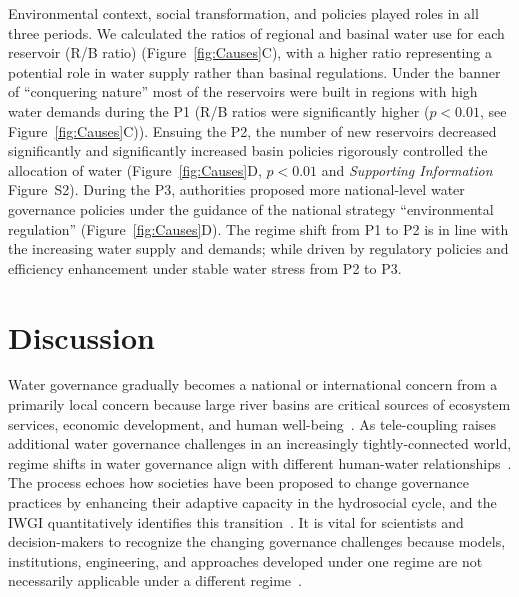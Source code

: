 \documentclass[draft]{../agujournal2019}
\begin{document}
Environmental context, social transformation, and policies played roles in all three periods.
We calculated the ratios of regional and basinal water use for each reservoir (R/B ratio) (Figure~\ref{fig:Causes}C), with a higher ratio representing a potential role in water supply rather than basinal regulations.
Under the banner of ``conquering nature'' most of the reservoirs were built in regions with high water demands during the P1 (R/B ratios were significantly higher ($p<0.01$, see Figure~\ref{fig:Causes}C)).
Ensuing the P2, the number of new reservoirs decreased significantly and significantly increased basin policies rigorously controlled the allocation of water (Figure~\ref{fig:Causes}D, $p<0.01$ and \textit{Supporting Information} Figure~S2).
During the P3, authorities proposed more national-level water governance policies under the guidance of the national strategy ``environmental regulation'' (Figure~\ref{fig:Causes}D).
The regime shift from P1 to P2 is in line with the increasing water supply and demands; while driven by regulatory policies and efficiency enhancement under stable water stress from P2 to P3.


\section{Discussion}\label{sec12}

Water governance gradually becomes a national or international concern from a primarily local concern because large river basins are critical sources of ecosystem services, economic development, and human well-being~\cite{best2019,best2020}.
As tele-coupling raises additional water governance challenges in an increasingly tightly-connected world, regime shifts in water governance align with different human-water relationships~\cite{diaz2019}.
The process echoes how societies have been proposed to change governance practices by enhancing their adaptive capacity in the hydrosocial cycle, and the IWGI quantitatively identifies this transition~\cite{loch2020,turton1999}.
It is vital for scientists and decision-makers to recognize the changing governance challenges because models, institutions, engineering, and approaches developed under one regime are not necessarily applicable under a different regime~\cite{reyers2018}.
\end{document}
